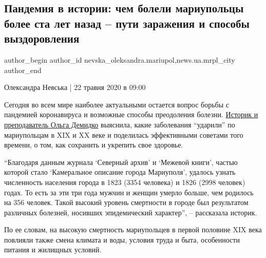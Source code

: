  
 
 
 
 
 
\subsection{Пандемия в истории: чем болели мариупольцы более ста лет назад – пути заражения и способы выздоровления}
\label{sec:22_05_2020.stz.news.ua.mrpl_city.1.pandemia_v_istorii_chem_boleli_mariupolcy_bolee_sta_let_nazad}
 
\ifcmt
 author_begin
   author_id nevska_oleksandra.mariupol,news.ua.mrpl_city
 author_end
\fi

Олександра Невська | 22 травня 2020 в 09:00

Сегодня во всем мире наиболее актуальными остается вопрос борьбы с пандемией
коронавируса и возможные способы преодоления болезни. \href{\urlDemidkoIA}{Историк и преподаватель
Ольга Демидко} выяснила, какие заболевания \enquote{ударили} по мариупольцам в XIX и XX
веке и поделилась эффективными советами того времени, о том, как сохранить и
укрепить свое здоровье.

\enquote{Благодаря данным журнала \enquote{Северный архив} и \enquote{Межевой книги}, частью которой
стало \enquote{Камеральное описание города Мариуполя}, удалось узнать численность
населения города в 1823 (3354 человека) и 1826 (2998 человек) годах. То есть за
эти три года мужчин и женщин умерло больше, чем родилось на 356 человек. Такой
высокий уровень смертности в городе был результатом различных болезней,
носивших эпидемический характер}, – рассказала историк.

По ее словам, на высокую смертность мариупольцев в первой половине XIX века
повлияли также смена климата и воды, условия труда и быта, особенности питания
и жилищных условий.


